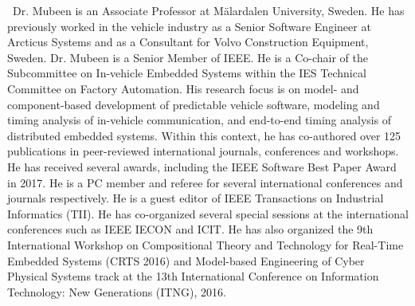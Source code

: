 \par\noindent 
\parbox[t]{\linewidth}{
\noindent{}
\
Dr. Mubeen is an Associate Professor at Mälardalen University, Sweden. He has previously worked in the vehicle industry as a Senior Software Engineer at Arcticus Systems and as a Consultant for Volvo Construction Equipment, Sweden. Dr. Mubeen is a Senior Member of IEEE. He is a Co-chair of the Subcommittee on In-vehicle Embedded Systems within the IES Technical Committee on Factory Automation. His research focus is on model- and component-based development of predictable vehicle software, modeling and timing analysis of in-vehicle communication, and end-to-end timing analysis of distributed embedded systems. Within this context, he has co-authored over 125 publications in peer-reviewed international journals, conferences and workshops. He has received several awards, including the IEEE Software Best Paper Award in 2017. He is a PC member and referee for several international conferences and journals respectively. He is a guest editor of IEEE Transactions on Industrial Informatics (TII). He has co-organized several special sessions at the international conferences such as IEEE IECON and ICIT.  He has also organized the 9th International Workshop on Compositional Theory and Technology for Real-Time Embedded Systems (CRTS 2016) and Model-based Engineering of Cyber Physical Systems track at the 13th International Conference on Information Technology: New Generations (ITNG), 2016.}
\vspace{4\baselineskip}